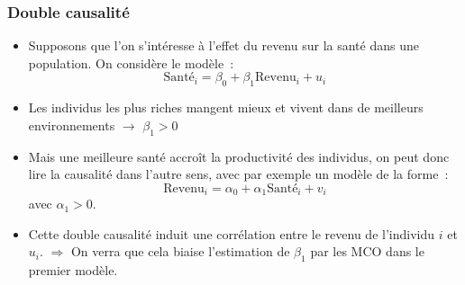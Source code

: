 \documentclass[10pt]{beamer}
\begin{document}
\begin{frame}
  \frametitle{Double causalité}

  \begin{itemize}

  \item Supposons que l'on s'intéresse à l'effet du revenu sur la santé dans une
    population. On considère le modèle~:
    \[
      \text{Santé}_i = \beta_0 + \beta_1 \text{Revenu}_i + u_i
    \]

  \item Les individus les plus riches mangent mieux et vivent dans de meilleurs
    environnements $\rightarrow$ $\beta_1>0$\newline

  \item Mais une meilleure santé accroît la productivité des individus, on peut
    donc lire la causalité dans l'autre sens, avec par exemple un modèle de la
    forme~:
    \[
      \text{Revenu}_i = \alpha_0 + \alpha_1 \text{Santé}_i + v_i
    \]
    avec $\alpha_1>0$.

  \item Cette double causalité induit une corrélation entre le revenu de
    l'individu $i$ et $u_i$. $\Rightarrow$ On verra que cela biaise l'estimation
    de $\beta_1$ par les MCO dans le premier modèle.

  \end{itemize}

\end{frame}
\end{document}
